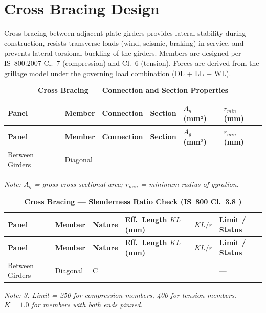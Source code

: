 \documentclass[12pt,a4paper]{report}
\numberwithin{table}{chapter}
\numberwithin{figure}{chapter}
\newcommand{\reportrowpad}{4pt}
\newcommand{\reportsectiongap}{0.75em}
\newcommand{\reportsmallgap}{0.4em}
\newcommand{\reporttabcolsep}{3pt}
\begin{document}
\section{Cross Bracing Design}
\label{sec:cross-bracing}

Cross bracing between adjacent plate girders provides lateral stability during construction, resists transverse loads (wind, seismic, braking) in service, and prevents lateral torsional buckling of the girders. Members are designed per IS~800:2007 Cl.~7 (compression) and Cl.~6 (tension). Forces are derived from the grillage model under the governing load combination  (DL + LL + WL).

\vspace{\reportsectiongap}

\vspace{\reportsmallgap}
\noindent
\setlength{\tabcolsep}{\reporttabcolsep}
\setlength\LTleft{0pt}
\setlength\LTright{\fill}

\begin{longtable}{|C{2.0cm}|L{2.0cm}|L{2.2cm}|C{2.5cm}|C{2.0cm}|C{2.0cm}|}
\caption{\textbf{Cross Bracing --- Connection and Section Properties}}\\
\hline
\textbf{Panel} & \textbf{Member} & \textbf{Connection} & \textbf{Section} & \textbf{$A_g$ (mm²)} & \textbf{$r_{min}$ (mm)} \\[\reportrowpad]
\hline
\endfirsthead
\hline
\textbf{Panel} & \textbf{Member} & \textbf{Connection} & \textbf{Section} & \textbf{$A_g$ (mm²)} & \textbf{$r_{min}$ (mm)} \\[\reportrowpad]
\hline
\endhead
Between Girders & Diagonal &  &  &  &  \\[\reportrowpad]
\hline
\end{longtable}
\noindent\textit{Note: $A_g$ = gross cross-sectional area; $r_{min}$ = minimum radius of gyration.}

\vspace{\reportsectiongap}
\begin{longtable}{|C{2.2cm}|L{2.2cm}|L{2.5cm}|C{2.5cm}|C{2.5cm}|>{\centering\arraybackslash}p{3.6cm}|}
\caption{\textbf{Cross Bracing --- Slenderness Ratio Check (IS~800 Cl.~3.8 )}}\\
\hline
\textbf{Panel} & \textbf{Member} & \textbf{Nature} & \textbf{Eff.\ Length $KL$ (mm)} & \textbf{$KL/r$} & \textbf{Limit / Status} \\[\reportrowpad]
\hline
\endfirsthead
\hline
\textbf{Panel} & \textbf{Member} & \textbf{Nature} & \textbf{Eff.\ Length $KL$ (mm)} & \textbf{$KL/r$} & \textbf{Limit / Status} \\[\reportrowpad]
\hline
\endhead
Between Girders & Diagonal & C &  &  &  ---  \\[\reportrowpad]
\hline
\end{longtable}
\noindent\textit{Note:  3. Limit = 250 for compression members, 400 for tension members. $K = 1.0$ for members with both ends pinned.}
\end{document}

